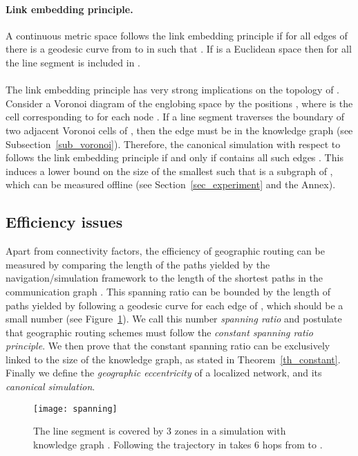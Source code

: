 \documentclass{article}
\begin{document}
\paragraph{Link embedding principle.} A continuous metric space  follows the link embedding principle if for all edges  of  there is a geodesic curve  from  to  in  such that . If  is a Euclidean space then for all  the line segment  is included in .

\paragraph{}
The link embedding principle has very strong implications on the topology of . Consider a Voronoi diagram of the englobing space  by the positions , where  is the cell corresponding to  for each node . If a line segment  traverses the boundary of two adjacent Voronoi cells  of , then the edge  must be in the knowledge graph  (see Subsection~\ref{sub_voronoi}). 
Therefore, the canonical simulation with respect to  follows the link embedding principle if and only if  contains all such edges .
This induces a lower bound on the size of the smallest  such that  is a subgraph of , which can be measured offline (see Section~\ref{sec_experiment} and the Annex). 

\subsection{Efficiency issues}
\label{sub_spanning}

Apart from connectivity factors, the efficiency of geographic routing can be measured by comparing the length of the paths yielded by the navigation/simulation framework to the length of the shortest paths in the communication graph . This spanning ratio can be bounded by the length of paths yielded by following a geodesic curve for each edge of , which should be a small number (see Figure~\ref{fig_spanning}). We call this number {\em spanning ratio} and postulate that geographic routing schemes must follow the {\em constant spanning ratio principle}. We then prove that the constant spanning ratio can be exclusively linked to the size of the knowledge graph, as stated in Theorem~\ref{th_constant}. Finally we define the {\em geographic eccentricity} of a localized network, and its {\em canonical simulation}.

\begin{figure}[h]
\begin{center}
\texttt{[image: spanning]}
\caption{The line segment  is covered by 3 zones in a simulation with knowledge graph . Following the trajectory  in  takes 6 hops from  to .}
\label{fig_spanning}
\end{center}
\end{figure}
\end{document}
